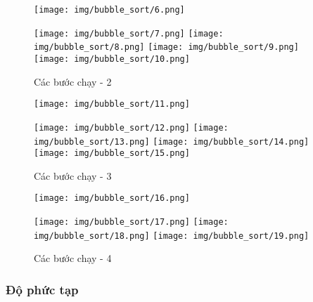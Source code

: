 \begin{figure}[H]
    \centering
    \texttt{[image: img/bubble\_sort/6.png]}
    
    \vspace{0.5cm}
    \texttt{[image: img/bubble\_sort/7.png]}
    \vspace{0.5cm}
    \texttt{[image: img/bubble\_sort/8.png]}
    \vspace{0.5cm}
    \texttt{[image: img/bubble\_sort/9.png]}
    \vspace{0.5cm}
    \texttt{[image: img/bubble\_sort/10.png]}
    \caption{Các bước chạy - 2}
    \label{fig:part2}
\end{figure}

\begin{figure}[H]
    \centering
    \texttt{[image: img/bubble\_sort/11.png]}
    
    \vspace{0.5cm}
    \texttt{[image: img/bubble\_sort/12.png]}
    \vspace{0.5cm}
    \texttt{[image: img/bubble\_sort/13.png]}
    \vspace{0.5cm}
    \texttt{[image: img/bubble\_sort/14.png]}
    \vspace{0.5cm}
    \texttt{[image: img/bubble\_sort/15.png]}
    \caption{Các bước chạy - 3}
    \label{fig:part3}
\end{figure}

\begin{figure}[H]
    \centering
    \texttt{[image: img/bubble\_sort/16.png]}
    
    \vspace{0.5cm}
    \texttt{[image: img/bubble\_sort/17.png]}
    \vspace{0.5cm}
    \texttt{[image: img/bubble\_sort/18.png]}
    \vspace{0.5cm}
    \texttt{[image: img/bubble\_sort/19.png]}
    \caption{Các bước chạy - 4}
    \label{fig:part4}
\end{figure}


\subsubsection{Độ phức tạp}